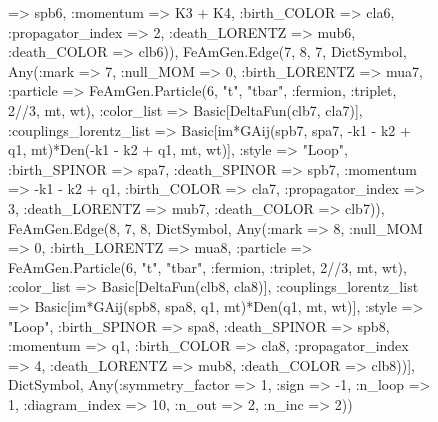 \documentclass{revtex4}
\begin{document}
\begin{figure}[!htb]
\begin{center}
{=> spb6, :momentum => K3 + K4, :birth_COLOR => cla6, :propagator_index => 2, :death_LORENTZ => mub6, :death_COLOR => clb6)), FeAmGen.Edge(7, 8, 7, Dict{Symbol, Any}(:mark => 7, :null_MOM => 0, :birth_LORENTZ => mua7, :particle => FeAmGen.Particle(6, "t", "tbar", :fermion, :triplet, 2//3, mt, wt), :color_list => Basic[DeltaFun(clb7, cla7)], :couplings_lorentz_list => Basic[im*GAij(spb7, spa7, -k1 - k2 + q1, mt)*Den(-k1 - k2 + q1, mt, wt)], :style => "Loop", :birth_SPINOR => spa7, :death_SPINOR => spb7, :momentum => -k1 - k2 + q1, :birth_COLOR => cla7, :propagator_index => 3, :death_LORENTZ => mub7, :death_COLOR => clb7)), FeAmGen.Edge(8, 7, 8, Dict{Symbol, Any}(:mark => 8, :null_MOM => 0, :birth_LORENTZ => mua8, :particle => FeAmGen.Particle(6, "t", "tbar", :fermion, :triplet, 2//3, mt, wt), :color_list => Basic[DeltaFun(clb8, cla8)], :couplings_lorentz_list => Basic[im*GAij(spb8, spa8, q1, mt)*Den(q1, mt, wt)], :style => "Loop", :birth_SPINOR => spa8, :death_SPINOR => spb8, :momentum => q1, :birth_COLOR => cla8, :propagator_index => 4, :death_LORENTZ => mub8, :death_COLOR => clb8))], Dict{Symbol, Any}(:symmetry_factor => 1, :sign => -1, :n_loop => 1, :diagram_index => 10, :n_out => 2, :n_inc => 2)) 
}
\end{center}
\end{figure}
\end{document}
